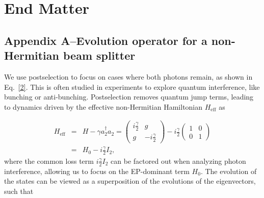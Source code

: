 \documentclass[%
reprint,
superscriptaddress,
amsthm,amsmath,amssymb,
aps,
]{revtex4-1}
\begin{document}
	\nocite{*}
	


\clearpage

\appendix
\onecolumngrid
\section*{\label{sec:leveled}End Matter}	

\twocolumngrid
\subsection*{\label{sec:leveled1}Appendix A--Evolution operator for a non-Hermitian beam splitter }

We use postselection to focus on cases where both photons remain, as shown in Eq.~\ref{2}. This is often studied in experiments to explore quantum interference, like bunching or anti-bunching. Postselection removes quantum jump terms, leading to dynamics driven by the effective non-Hermitian Hamiltonian $H_{\text{eff}}$ as

\begin{eqnarray}
	H_{\text{eff}}	 &=&H-\gamma a_{2}^{\dagger}a_{2}=\begin{pmatrix} i \frac{\gamma}{2} & g \\
		g & -i \frac{\gamma}{2} \end{pmatrix}	-  i \frac{\gamma}{2} \begin{pmatrix} 1 &0 \\
		0 & 1 \end{pmatrix}\nonumber\\&=&H_{0}	-  i \frac{\gamma}{2} I_{2},
\end{eqnarray}
where the common loss term $i\frac{\gamma}{2}I_2$ can be factored out when analyzing photon interference, allowing us to focus on the EP-dominant term $H_0$. The evolution of the states can be viewed as a superposition of the evolutions of the eigenvectors, such that
\end{document}

